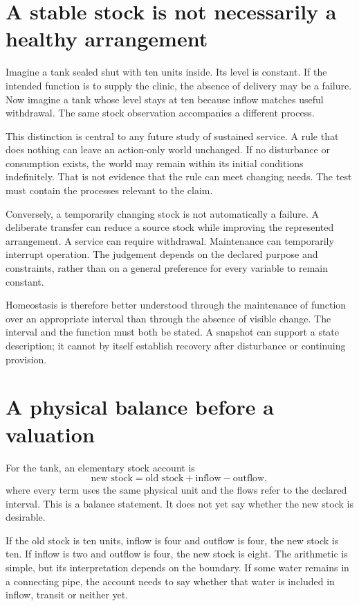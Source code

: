 \section{A stable stock is not necessarily a healthy arrangement}
Imagine a tank sealed shut with ten units inside. Its level is constant. If the intended function is to supply the clinic, the absence of delivery may be a failure. Now imagine a tank whose level stays at ten because inflow matches useful withdrawal. The same stock observation accompanies a different process.

This distinction is central to any future study of sustained service. A rule that does nothing can leave an action-only world unchanged. If no disturbance or consumption exists, the world may remain within its initial conditions indefinitely. That is not evidence that the rule can meet changing needs. The test must contain the processes relevant to the claim.

Conversely, a temporarily changing stock is not automatically a failure. A deliberate transfer can reduce a source stock while improving the represented arrangement. A service can require withdrawal. Maintenance can temporarily interrupt operation. The judgement depends on the declared purpose and constraints, rather than on a general preference for every variable to remain constant.

Homeostasis is therefore better understood through the maintenance of function over an appropriate interval than through the absence of visible change. The interval and the function must both be stated. A snapshot can support a state description; it cannot by itself establish recovery after disturbance or continuing provision.

\section{A physical balance before a valuation}
For the tank, an elementary stock account is
\begin{equation}
\text{new stock}=\text{old stock}+\text{inflow}-\text{outflow},
\end{equation}
where every term uses the same physical unit and the flows refer to the declared interval. This is a balance statement. It does not yet say whether the new stock is desirable.

If the old stock is ten units, inflow is four and outflow is four, the new stock is ten. If inflow is two and outflow is four, the new stock is eight. The arithmetic is simple, but its interpretation depends on the boundary. If some water remains in a connecting pipe, the account needs to say whether that water is included in inflow, transit or neither yet.


